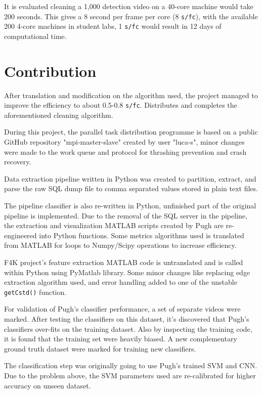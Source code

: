 \documentclass[bsc,logo,twoside,fullspacing,parskip]{infthesis}
\begin{document}
It is evaluated cleaning a 1,000 detection video on a 40-core machine would take 200 seconds.
This gives a 8 second per frame per core (8 {\tt s/fc}), with the available 200 4-core machines in student labs, 1 {\tt s/fc} would result in 12 days of computational time.

\section{Contribution}

After translation and modification on the algorithm used, the project managed to improve the efficiency to about 0.5-0.8 {\tt s/fc}. Distributes and completes the aforementioned cleaning algorithm.

During this project, the parallel task distribution programme is based on a public GitHub repository "mpi-master-slave" created by user "luca-s"\cite{L5}, minor changes were made to the work queue and protocol for thrashing prevention and crash recovery.

Data extraction pipeline written in Python was created to partition, extract, and parse the raw SQL dump file to comma separated values stored in plain text files. 

The pipeline classifier is also re-written in Python, unfinished part of the original pipeline is implemented. 
Due to the removal of the SQL server in the pipeline, the extraction and visualization MATLAB scripts created by Pugh are re-engineered into Python functions. 
Some metrics algorithms used is translated from MATLAB for loops to Numpy/Scipy operations to increase efficiency.

F4K project's feature extraction MATLAB code is untranslated and is called within Python using PyMatlab library. Some minor changes like replacing edge extraction algorithm used, and error handling added to one of the unstable {\tt getCstd()} function. 

For validation of Pugh's classifier performance, a set of separate videos were marked. After testing the classifiers on this dataset, it's discovered that Pugh's classifiers over-fits on the training dataset. Also by inspecting the training code, it is found that the training set were heavily biased. A new complementary ground truth dataset were marked for training new classifiers. 

The classification step was originally going to use Pugh's trained SVM and CNN. Due to the problem above, the SVM parameters used are re-calibrated for higher accuracy on unseen dataset. 
\end{document}
